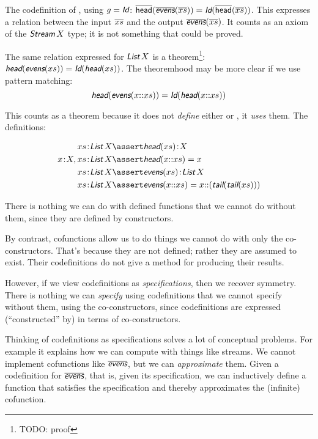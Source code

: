 \documentclass{article}
\begin{document}
\vspace{1ex}

The codefinition of , using \(g = \idfun\):
\(\cohead(\codefn{evens}(\coseq{x})) = \idfun(\cohead(\coseq{x}))\).
This expresses a relation between the input \(\overline{xs}\) and the
output \(\codefn{evens}(\coseq{x})\). It counts as an axiom of the
\(\Stream\,X\) type; it is not something that could be proved.

The same relation expressed for \(\List\,X\) is a theorem\footnote{TODO: proof}:
\(\head(\defn{evens}(\seq{x})) = \idfun(\head(\seq{x}))\). The theoremhood may be more clear if we use pattern matching:
\[\head(\defn{evens}(x\cons\seq{x})) = \idfun(\head(x\cons\seq{x}))\]

This counts as a theorem because it does not \textit{define} either
\head{} or , it \textit{uses} them. The definitions:

\begin{align}
 \tj{\seq{x}}{\List\,X} & \linfer \tj{\head(\seq{x})}{X} \\
 \tj{x}{X},\tj{\seq{x}}{\List\,X} & \linfer \head(x\cons\seq{x}) = x \\
 \tj{\seq{x}}{\List\,X} & \linfer \tj{\defn{evens}(\seq{x})}{\List\,X} \\
 \tj{\seq{x}}{\List\,X} & \linfer \defn{evens}(x\cons\seq{x})
   = x\cons(\tail(\tail(\seq{x})))
\end{align}

There is nothing we can do with defined functions that we cannot do
without them, since they are defined by constructors.

By contrast, cofunctions allow us to do things we cannot do with only
the co-constructors. That's because they are not defined; rather they
are assumed to exist. Their codefinitions do not give a method for
producing their results.

However, if we view codefinitions as \textit{specifications}, then we
recover symmetry. There is nothing we can \textit{specify} using
codefinitions that we cannot specify without them, using the
co-constructors, since codefinitions are expressed (``constructed''
by) in terms of co-constructors.

Thinking of codefinitions as specifications solves a lot of conceptual
problems. For example it explains how we can compute with things like
streams. We cannot implement cofunctions like \(\codefn{evens}\), but
we can \textit{approximate} them. Given a codefinition for
\(\codefn{evens}\), that is, given its specification, we can
inductively define a function that satisfies the specification and
thereby approximates the (infinite) cofunction.
\end{document}
